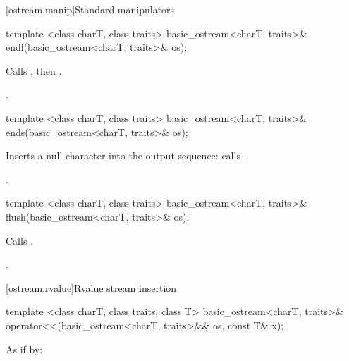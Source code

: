 [ostream.manip]{Standard  manipulators}

%
\begin{itemdecl}
template <class charT, class traits>
  basic_ostream<charT, traits>& endl(basic_ostream<charT, traits>& os);
\end{itemdecl}

\begin{itemdescr}
\pnum
\effects
Calls
,
then
.

\pnum
\returns
{}.
\end{itemdescr}

%
\begin{itemdecl}
template <class charT, class traits>
  basic_ostream<charT, traits>& ends(basic_ostream<charT, traits>& os);
\end{itemdecl}

\begin{itemdescr}
\pnum
\effects
Inserts a null character into the output sequence:
calls
.

\pnum
\returns
{}.
\end{itemdescr}

%
\begin{itemdecl}
template <class charT, class traits>
  basic_ostream<charT, traits>& flush(basic_ostream<charT, traits>& os);
\end{itemdecl}

\begin{itemdescr}
\pnum
\effects
Calls
.

\pnum
\returns
{}.
\end{itemdescr}

[ostream.rvalue]{Rvalue stream insertion}

%
%
\begin{itemdecl}
template <class charT, class traits, class T>
  basic_ostream<charT, traits>&
  operator<<(basic_ostream<charT, traits>&& os, const T& x);
\end{itemdecl}

\begin{itemdescr}
\pnum
\effects As if by: 

\pnum
\returns {}
\end{itemdescr}


